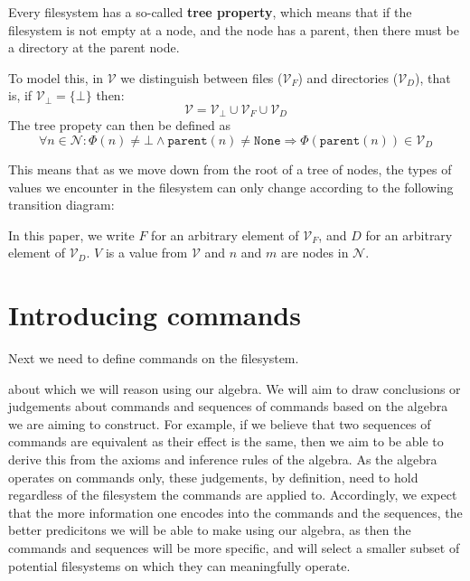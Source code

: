 \documentclass[12pt]{article}
\newcommand{\setv}{\mathcal{V}} %
\newcommand{\setvx}[1]{\mathcal{V}_{#1}}
\newcommand{\setf}{\setvx{F}} %
\newcommand{\setd}{\setvx{D}} %
\newcommand{\setb}{\setvx{\empt}} %
\newcommand{\setn}{\mathcal{N}} %
\newcommand{\empt}{\bot}
\newcommand{\parent}{\mathtt{parent}}
\newcommand{\topnode}{\mathtt{None}} %
\newcommand{\FS}{\Phi} %
\theoremstyle{definition}
\begin{document}
Every filesystem has a so-called \textbf{tree property}, which means that
if the filesystem is not empty at a node, and the node has a parent,
then there must be a directory at the parent node.

To model this, in $\setv$ we distinguish between files ($\setf$) and directories ($\setd$), that is,
if $\setb = \{\empt\}$ then:
\[ \setv = \setb \cup \setf \cup \setd \]
The tree propety can then be defined as
\[ \forall n\in\setn : \FS(n) \neq \empt \wedge \parent(n) \neq \topnode \Rightarrow \FS(\parent(n)) \in \setd \]

This means that as we move down from the root of a tree of nodes,
the types of values we encounter in the filesystem can only change according to the following
transition diagram:



In this paper, we write $F$ for an arbitrary element of $\setf$, and $D$ for an arbitrary element
of $\setd$. $V$ is a value from $\setv$ and $n$ and $m$ are nodes in $\setn$.






\section{Introducing commands}

Next we need to define commands on the filesystem.

 about which we will reason
using our algebra.
We will aim to draw conclusions or judgements about commands and sequences of commands
based on the algebra we are aiming to construct.
For example, if we believe that two sequences of commands are equivalent as their effect
is the same, then we aim to be able to derive this from the axioms and inference rules of the
algebra.
As the algebra operates on commands only,
these judgements, by definition, need to hold regardless of the filesystem the commands are applied to.
Accordingly, we expect that the more information one encodes into the commands and the sequences,
the better predicitons we will be able to make using our algebra,
as then the commands and sequences will be more specific, and will select a smaller subset
of potential filesystems on which they can meaningfully operate.
\end{document}
